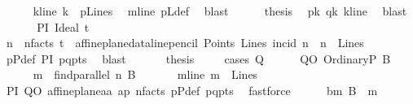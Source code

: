 \begin{isabellebody}
\ \ \ \ \isamarkupfalse%
\ k{\isacharunderscore}{\kern0pt}line{\isacharcolon}{\kern0pt}\ {\isachardoublequoteopen}{\isacharquery}{\kern0pt}k\ {\isasymin}\ pLines{\isachardoublequoteclose}\ \isamarkupfalse%
\ m{\isacharunderscore}{\kern0pt}line\ pLdef\ \isamarkupfalse%
\ blast\isanewline
\ \ \ \ \isamarkupfalse%
\ {\isacharquery}{\kern0pt}thesis\ \isamarkupfalse%
\ pk\ qk\ k{\isacharunderscore}{\kern0pt}line\ \isamarkupfalse%
\ blast\isanewline
\ \ \isamarkupfalse%
\isanewline
{}\isamarkupfalse%
\isanewline
\ \ \isamarkupfalse%
\ PI{\isacharcolon}{\kern0pt}\ {\isacharparenleft}{\kern0pt}Ideal\ t{\isacharparenright}{\kern0pt}\isanewline
\ \ \isamarkupfalse%
\ n\ \ n{\isacharunderscore}{\kern0pt}facts{\isacharcolon}{\kern0pt}\ {\isachardoublequoteopen}t\ {\isacharequal}{\kern0pt}\ affine{\isacharunderscore}{\kern0pt}plane{\isacharunderscore}{\kern0pt}data{\isachardot}{\kern0pt}line{\isacharunderscore}{\kern0pt}pencil\ Points\ Lines\ {\isacharparenleft}{\kern0pt}incid{\isacharparenright}{\kern0pt}\ n\ {\isasymand}\ n\ {\isasymin}\ Lines{\isachardoublequoteclose}\ \isamarkupfalse%
\ pPdef\ PI\ pq{\isacharunderscore}{\kern0pt}pts\ \isamarkupfalse%
\ blast\ \isanewline
\ \ \isamarkupfalse%
\ \isamarkupfalse%
\ {\isacharquery}{\kern0pt}thesis\ \isanewline
\ \ \isamarkupfalse%
\ {\isacharparenleft}{\kern0pt}cases\ Q{\isacharparenright}{\kern0pt}\isanewline
\ \ \ \ \isamarkupfalse%
\ QO{\isacharcolon}{\kern0pt}\ {\isacharparenleft}{\kern0pt}OrdinaryP\ B{\isacharparenright}{\kern0pt}\isanewline
\ \ \ \ \isamarkupfalse%
\ {\isacharquery}{\kern0pt}m\ {\isacharequal}{\kern0pt}\ {\isachardoublequoteopen}find{\isacharunderscore}{\kern0pt}parallel\ n\ B{\isachardoublequoteclose}\ \isanewline
\ \ \ \ \isamarkupfalse%
\ m{\isacharunderscore}{\kern0pt}line{\isacharcolon}{\kern0pt}\ {\isachardoublequoteopen}{\isacharquery}{\kern0pt}m\ {\isasymin}\ Lines{\isachardoublequoteclose}\ \isamarkupfalse%
\ PI\ QO\ affine{\isacharunderscore}{\kern0pt}plane{\isachardot}{\kern0pt}a{}a\ ap\ n{\isacharunderscore}{\kern0pt}facts\ pPdef\ pq{\isacharunderscore}{\kern0pt}pts\ \isamarkupfalse%
\ fastforce\isanewline
\ \ \ \ \isamarkupfalse%
\ bm{\isacharcolon}{\kern0pt}\ {\isachardoublequoteopen}B\ {\isasymlhd}\ {\isacharquery}{\kern0pt}m{\isachardoublequoteclose}\ \isamarkupfalse%

\end{isabellebody}
